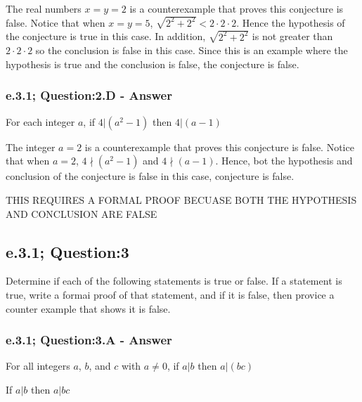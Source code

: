 The real numbers $x = y = 2$ is a counterexample that proves this conjecture is false. Notice that when $x=y=5$, $\sqrt{2^2 + 2^ 2} < 2 \cdot 2 \cdot 2$. Hence the hypothesis of the conjecture is true in this case. In addition, $\sqrt{2^2 + 2^ 2}$ is not greater than $2 \cdot 2 \cdot 2$ so the conclusion is false in this case. Since this is an example where the hypothesis is true and the conclusion is false, the conjecture is false. 



\subsubsection*{e.3.1; Question:2.D - Answer}

\begin{tcolorbox}
	\begin{conjecture}
		For each integer $a$, if $4|(a^2 - 1)$ then $4|(a-1)$
	\end{conjecture}
\end{tcolorbox}

The integer $a = 2$ is a counterexample that proves this conjecture is false. Notice that when $a=2$, $4 \nmid (a^2 - 1)$ and $4 \nmid (a-1)$. Hence, bot the hypothesis and conclusion of the conjecture is false in this case, conjecture is false. 

THIS REQUIRES A FORMAL PROOF BECUASE BOTH THE HYPOTHESIS AND CONCLUSION ARE FALSE



\newpage
\subsection{e.3.1; Question:3}
Determine if each of the following statements is true or false. If a statement is true, write a formai proof of that statement, and if it is false, then provice a counter example that shows it is false. 

\subsubsection*{e.3.1; Question:3.A - Answer}
For all integers $a$, $b$, and $c$ with $a \neq 0$, if $a |b$ then $a|(bc)$

\begin{tcolorbox}
	\begin{theorem}
		If $a | b$ then $a | bc$
	\end{theorem}
\end{tcolorbox}

